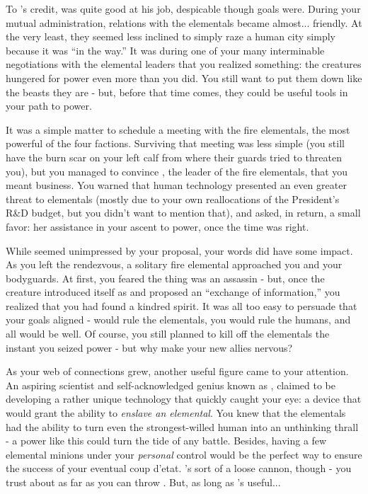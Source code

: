 \documentclass[char]{elementals}
\begin{document}
To \cLeader{}'s credit, \cLeader{\they} was quite good at his job, despicable though \cLeader{\their} goals were. During your mutual administration, relations with the elementals became almost... friendly. At the very least, they seemed less inclined to simply raze a human city simply because it was ``in the way.'' It was during one of your many interminable negotiations with the elemental leaders that you realized something: the creatures hungered for power even more than you did. You still want to put them down like the beasts they are - but, before that time comes, they could be useful tools in your path to power.

It was a simple matter to schedule a meeting with the fire elementals, the most powerful of the four factions. Surviving that meeting was less simple (you still have the burn scar on your left calf from where their guards tried to threaten you), but you managed to convince \cQueen{\intro}, the leader of the fire elementals, that you meant business. You warned \cQueen{\them} that human technology presented an even greater threat to elementals (mostly due to your own reallocations of the President's R\&D budget, but you didn't want to mention that), and asked, in return, a small favor: her assistance in your ascent to power, once the time was right.

While \cQueen{} seemed unimpressed by your proposal, your words did have some impact. As you left the rendezvous, a solitary fire elemental approached you and your bodyguards. At first, you feared the thing was an assassin - but, once the creature introduced itself as \cPyro{\intro} and proposed an ``exchange of information,'' you realized that you had found a kindred spirit. It was all too easy to persuade \cPyro{\them} that your goals aligned - \cPyro{\they} would rule the elementals, you would rule the humans, and all would be well. Of course, you still planned to kill off the elementals the instant you seized power - but why make your new allies nervous?

As your web of connections grew, another useful figure came to your attention. An aspiring scientist and self-acknowledged genius known as \cMS{\intro}, \cMS{\they} claimed to be developing a rather unique technology that quickly caught your eye: a device that would grant the ability to \emph{enslave an elemental}. You knew that the elementals had the ability to turn even the strongest-willed human into an unthinking thrall - a power like this could turn the tide of any battle. Besides, having a few elemental minions under your \emph{personal} control would be the perfect way to ensure the success of your eventual coup d'etat. \cMS{\they}'s sort of a loose cannon, though - you trust \cMS{\them} about as far as you can throw \cMS{\them}. But, as long as \cMS{\they}'s useful...
\end{document}
